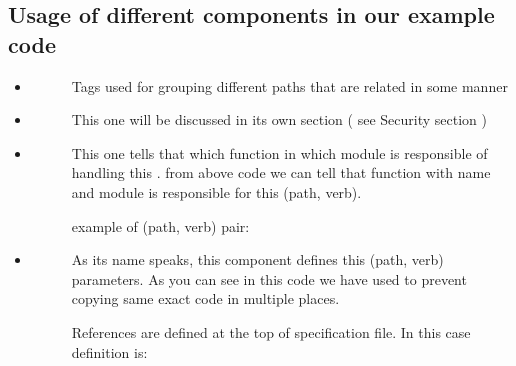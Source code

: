 \documentclass[letterpaper,10pt,english]{sphinxmanual}
\begin{document}
\subsection{Usage of different components in our example code}
\label{\detokenize{RestAPI:usage-of-different-components-in-our-example-code}}\begin{itemize}
\item {} \begin{description}
\item[{}] \leavevmode
Tags used for grouping different paths that are related in some manner

\end{description}

\item {} \begin{description}
\item[{}] \leavevmode
This one will be discussed in its own section ( see Security section )

\end{description}

\item {} \begin{description}
\item[{}] \leavevmode
This one tells that which function in which module is responsible of handling this .
from above code we can tell that function with name  and module  is responsible
for this (path, verb).
\begin{description}
\item[{example of (path, verb) pair:}] \leavevmode
{}

\end{description}

\end{description}

\item {} \begin{description}
\item[{}] \leavevmode
As its name speaks, this component defines this (path, verb) parameters.
As you can see in this code we have used  to prevent copying same exact code in multiple places.

References are defined at the top of specification file.
In this case definition is:


\end{description}
\end{itemize}
\end{document}
